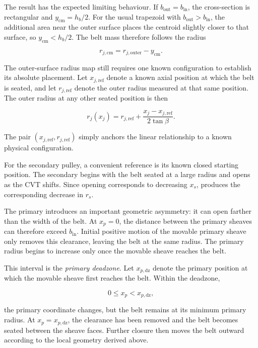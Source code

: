 \documentclass[11pt]{report}
\numberwithin{equation}{section}
\begin{document}
The result has the expected limiting behaviour. If
\(b_{\mathrm{out}}=b_{\mathrm{in}}\), the cross-section is rectangular and
\(y_{\mathrm{cm}}=h_b/2\). For the usual trapezoid with
\(b_{\mathrm{out}}>b_{\mathrm{in}}\), the additional area near the outer
surface places the centroid slightly closer to that surface, so
\(y_{\mathrm{cm}}<h_b/2\). The belt mass therefore follows the radius

\begin{equation}
r_{j,\mathrm{cm}}
=
r_{j,\mathrm{outer}}-y_{\mathrm{cm}}.
\label{eq:local_belt_mass_centroid_radius}
\end{equation}

The outer-surface radius map still requires one known configuration to
establish its absolute placement. Let \(x_{j,\mathrm{ref}}\) denote a known
axial position at which the belt is seated, and let
\(r_{j,\mathrm{ref}}\) denote the outer radius measured at that same position.
The outer radius at any other seated position is then

\begin{equation}
r_j(x_j)
=
r_{j,\mathrm{ref}}
+
\frac{x_j-x_{j,\mathrm{ref}}}{2\tan\beta}.
\label{eq:local_radius_map}
\end{equation}

The pair
\(\left(x_{j,\mathrm{ref}},r_{j,\mathrm{ref}}\right)\)
simply anchors the linear relationship to a known physical configuration.

For the secondary pulley, a convenient reference is its known closed starting
position. The secondary begins with the belt seated at a large radius and
opens as the CVT shifts. Since opening corresponds to decreasing \(x_s\),
 produces the corresponding decrease in \(r_s\).

The primary introduces an important geometric asymmetry: it can open farther
than the width of the belt. At \(x_p=0\), the distance between the primary
sheaves can therefore exceed \(b_{\mathrm{in}}\). Initial positive motion of
the movable primary sheave only removes this clearance, leaving the belt at
the same radius. The primary radius begins to increase only once the movable
sheave reaches the belt.

This interval is the \emph{primary deadzone}. Let
\(x_{p,\mathrm{dz}}\) denote the primary position at which the movable sheave
first reaches the belt. Within the deadzone,

\[
0\leq x_p<x_{p,\mathrm{dz}},
\]

the primary coordinate changes, but the belt remains at its minimum primary
radius. At \(x_p=x_{p,\mathrm{dz}}\), the clearance has been removed and the
belt becomes seated between the sheave faces. Further closure then moves the
belt outward according to the local geometry derived above.
\end{document}
